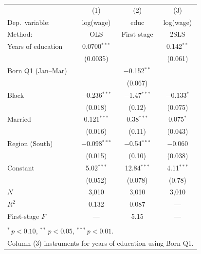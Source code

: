 \documentclass[11pt]{article}
\begin{document}
\begin{center}
\renewcommand{\arraystretch}{1.05}
\begin{tabular}{lccc}
\toprule
                   & (1)           & (2)               & (3) \\
Dep.\ variable:    & log(wage)     & educ              & log(wage) \\
Method:            & OLS           & First stage       & 2SLS \\
\midrule
Years of education & 0.0700$^{***}$ &                   & 0.142$^{**}$ \\
                   & (0.0035)       &                   & (0.061) \\
\addlinespace
Born Q1 (Jan--Mar) &                & $-$0.152$^{**}$   & \\
                   &                & (0.067)           & \\
\addlinespace
Black              & $-$0.236$^{***}$ & $-$1.47$^{***}$ & $-$0.133$^{*}$ \\
                   & (0.018)          & (0.12)          & (0.075) \\
\addlinespace
Married            & 0.121$^{***}$   & 0.38$^{***}$     & 0.075$^{*}$ \\
                   & (0.016)         & (0.11)           & (0.043) \\
\addlinespace
Region (South)     & $-$0.098$^{***}$ & $-$0.54$^{***}$ & $-$0.060 \\
                   & (0.015)          & (0.10)          & (0.038) \\
\addlinespace
Constant           & 5.02$^{***}$    & 12.84$^{***}$    & 4.11$^{***}$ \\
                   & (0.052)         & (0.078)          & (0.78) \\
\midrule
$N$                & 3{,}010         & 3{,}010          & 3{,}010 \\
$R^{2}$            & 0.132           & 0.087            & --- \\
First-stage $F$    & ---             & 5.15             & --- \\
\bottomrule
\addlinespace
\multicolumn{4}{l}{\footnotesize Standard errors in parentheses.} \\
\multicolumn{4}{l}{\footnotesize $^{*}\,p<0.10$, $^{**}\,p<0.05$, $^{***}\,p<0.01$.} \\
\multicolumn{4}{l}{\footnotesize Column (3) instruments for years of education using Born Q1.} \\
\end{tabular}
\end{center}
\end{document}
